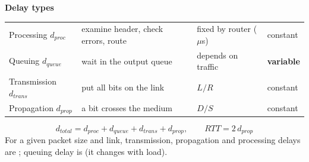 \begin{solution}
\textbf{Delay types} 

\smallskip
{\small\zebra
\begin{tabularx}{\linewidth}{L{33mm}YL{30mm}L{15mm}}\toprule
{} &  &  & \\\midrule
Processing $d_{proc}$ & examine header, check errors, route & fixed by router ($\mu$s) & constant\\
Queuing $d_{queue}$ & wait in the output queue & depends on traffic & \textbf{variable}\\
Transmission $d_{trans}$ & put all bits on the link & $L/R$ & constant\\
Propagation $d_{prop}$ & a bit crosses the medium & $D/S$ & constant\\\bottomrule
\end{tabularx}}
\[
  d_{total}=d_{proc}+d_{queue}+d_{trans}+d_{prop},\qquad RTT = 2\,d_{prop}
\]
For a given packet size and link, transmission, propagation and processing delays are ; queuing delay is  (it changes with load).


\end{solution}
